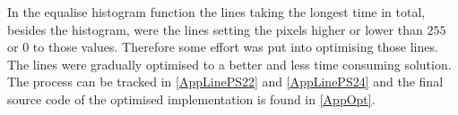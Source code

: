In the equalise histogram function the lines taking the longest time in total, besides the histogram, were the lines setting the pixels higher or lower than $ 255 $ or $ 0 $ to those values. Therefore some effort was put into optimising those lines. The lines were gradually optimised to a better and less time consuming solution. The process can be tracked in \autoref{AppLinePS22} and \autoref{AppLinePS24} and the final source code of the optimised implementation is found in \autoref{AppOpt}.